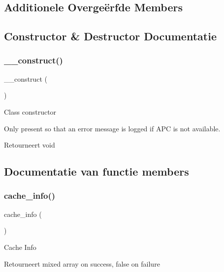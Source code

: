 \subsection*{Additionele Overge\"{e}rfde Members}


\subsection{Constructor \& Destructor Documentatie}
\mbox{\label{class_c_i___cache__wincache_a095c5d389db211932136b53f25f39685}} 
\subsubsection{\texorpdfstring{\_\_construct()}{\_\_construct()}}
{\footnotesize\ttfamily \+\_\+\+\_\+construct (\begin{DoxyParamCaption}{ }\end{DoxyParamCaption})}

Class constructor

Only present so that an error message is logged if A\+PC is not available.

\begin{DoxyReturn}{Retourneert}
void 
\end{DoxyReturn}


\subsection{Documentatie van functie members}
\mbox{\label{class_c_i___cache__wincache_acb4742926a6fa901e4f0917e1a35ef4c}} 
\subsubsection{\texorpdfstring{cache\_info()}{cache\_info()}}
{\footnotesize\ttfamily cache\+\_\+info (\begin{DoxyParamCaption}{ }\end{DoxyParamCaption})}

Cache Info

\begin{DoxyReturn}{Retourneert}
mixed array on success, false on failure 
\end{DoxyReturn}
\mbox{\label{class_c_i___cache__wincache_adb40b812890a8bc058bf6b7a0e1a54d9}} 

